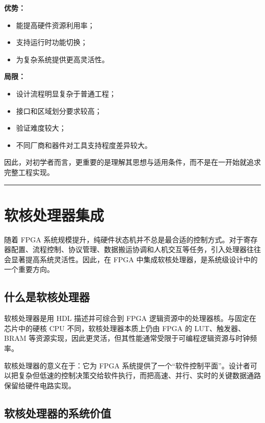 \textbf{优势：}

\begin{itemize}
\tightlist
\item
  能提高硬件资源利用率；
\item
  支持运行时功能切换；
\item
  为复杂系统提供更高灵活性。
\end{itemize}

\textbf{局限：}

\begin{itemize}
\tightlist
\item
  设计流程明显复杂于普通工程；
\item
  接口和区域划分要求较高；
\item
  验证难度较大；
\item
  不同厂商和器件对工具支持程度差异较大。
\end{itemize}

因此，对初学者而言，更重要的是理解其思想与适用条件，而不是在一开始就追求完整工程实现。

\begin{center}\rule{0.5\linewidth}{0.5pt}\end{center}

\section{软核处理器集成}\label{ux8f6fux6838ux5904ux7406ux5668ux96c6ux6210}

随着 FPGA
系统规模提升，纯硬件状态机并不总是最合适的控制方式。对于寄存器配置、流程控制、协议管理、数据搬运协调和人机交互等任务，引入处理器往往会显著提高系统灵活性。因此，在
FPGA 中集成软核处理器，是系统级设计中的一个重要方向。

\subsection{什么是软核处理器}\label{ux4ec0ux4e48ux662fux8f6fux6838ux5904ux7406ux5668}

软核处理器是用 HDL 描述并可综合到 FPGA
逻辑资源中的处理器核。与固定在芯片中的硬核 CPU
不同，软核处理器本质上仍由 FPGA 的 LUT、触发器、BRAM
等资源实现，因此更灵活，但其性能通常受限于可编程逻辑资源与时钟频率。

软核处理器的意义在于：它为 FPGA
系统提供了一个``软件控制平面''。设计者可以把复杂但低速的控制决策交给软件执行，而把高速、并行、实时的关键数据通路保留给硬件电路实现。

\subsection{软核处理器的系统价值}\label{ux8f6fux6838ux5904ux7406ux5668ux7684ux7cfbux7edfux4ef7ux503c}

